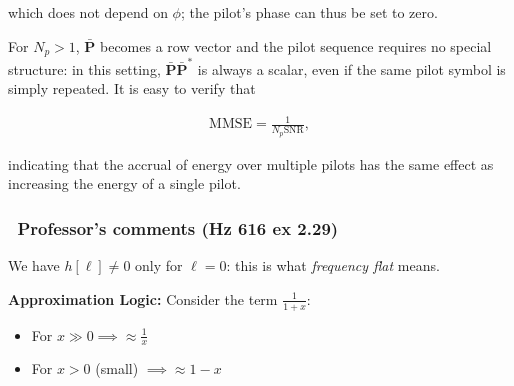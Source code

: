 \documentclass[a4paper, 12pt]{book}
\begin{document}
which does not depend on $\phi$; the pilot's phase can thus be set to zero.

For $N_p > 1$, $\bar{\boldsymbol{P}}$ becomes a row vector and the pilot sequence requires no special structure: in this setting, $\bar{\boldsymbol{P}}\bar{\boldsymbol{P}}^*$ is always a scalar, even if the same pilot symbol is simply repeated. It is easy to verify that

\begin{align}
\text{MMSE} = \frac{1}{N_p \text{SNR}}, \tag{2.252}
\end{align}

indicating that the accrual of energy over multiple pilots has the same effect as increasing the energy of a single pilot.

\hrulefill

\subsubsection*{\faPen\ Professor's comments (Hz 616 ex 2.29)}

We have $h[\ell] \neq 0$ only for $\ell=0$: this is what \textit{frequency flat} means.

\textbf{Approximation Logic:}
Consider the term $\frac{1}{1+x}$:
\begin{itemize}
    \item For $x \gg 0 \implies \approx \frac{1}{x}$
    \item For $x > 0$ (small) $\implies \approx 1-x$
\end{itemize}

\begin{center}
\end{center}
\end{document}
